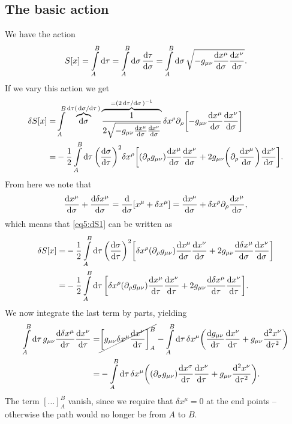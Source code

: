 \documentclass[11pt,a4paper, 
swedish, english %
]{article}
\begin{document}
\subsection{The basic action}
We have the action
\begin{equation}\label{eq5:S}
S[x]=\int_A^B\rd\tau=\int_A^B\rd\sigma\,\dv{\tau}{\sigma}
=\int_A^B\rd\sigma\,
\sqrt{-g_{\mu\nu}\dv{x^\mu}{\sigma}\dv{x^\nu}{\sigma}}.
\end{equation}
If we vary this action we get
\vspace{-1em}
\begin{equation}\label{eq5:dS1}
\begin{aligned}
\delta{S}[x]=&\int_A^B\overbrace{\rd\sigma}^{\rd\tau(\dv*{\sigma}{\tau})}
\overbrace{\frac{1}{2\sqrt{-g_{\mu\nu}\dv{x^\mu}{\sigma}\dv{x^\nu}{\sigma}}}}
^{=(2\dv*{\tau}{\sigma})^{-1}}
\delta{x}^\rho\pd_\rho\qty[-g_{\mu\nu}\dv{x^\mu}{\sigma}\dv{x^\nu}{\sigma}
]\\
=&-\frac{1}{2}\int_A^B\rd\tau\,
\qty(\dv{\sigma}{\tau})^2 \delta{x}^\rho
\qty[(\pd_{\rho}g_{\mu\nu})\dv{x^\mu}{\sigma}\dv{x^\nu}{\sigma}
+2g_{\mu\nu}\qty(\pd_{\rho}\dv{x^\mu}{\sigma})\dv{x^\nu}{\sigma}
].
\end{aligned}
\end{equation}
From here we note that
\begin{equation}
\dv{x^\mu}{\sigma}+\dv{\delta{x}^\mu}{\sigma}
=\dv{\sigma}\qty[x^\mu+\delta{x}^\mu]
=\dv{x^\mu}{\sigma}+\delta{x}^\rho\partial_\rho\dv{x^\mu}{\sigma},
\end{equation}
which means that \eqref{eq5:dS1} can be written as
\begin{equation}\label{eq5:dS2}
\begin{aligned}
\delta{S}[x]=&-\frac{1}{2}\int_A^B\rd\tau\,\qty(\dv{\sigma}{\tau})^2 
\qty[ \delta{x}^\rho(\pd_{\rho}g_{\mu\nu})
\dv{x^\mu}{\sigma}\dv{x^\nu}{\sigma}
+2g_{\mu\nu}\dv{\delta{x}^\mu}{\sigma}\dv{x^\nu}{\sigma}
]\\
=&-\frac{1}{2}\int_A^B\rd\tau\,
\qty[ \delta{x}^\rho(\pd_{\rho}g_{\mu\nu})
\dv{x^\mu}{\tau}\dv{x^\nu}{\tau}
+2g_{\mu\nu}\dv{\delta{x}^\mu}{\tau}\dv{x^\nu}{\tau}
].
\end{aligned}
\end{equation}
We now integrate the last term by parts, yielding
\begin{equation}
\begin{aligned}
\int_A^B\rd\tau\,g_{\mu\nu}\dv{\delta{x}^\mu}{\tau}\dv{x^\nu}{\tau}
=&\cancel{\qty[g_{\mu\nu}\delta{x}^\mu\dv{x^\nu}{\tau}]_A^B}
-\int_A^B\rd\tau\,\delta{x}^\mu
\qty(\dv{g_{\mu\nu}}{\tau}\dv{x^\nu}{\tau}
+g_{\mu\nu}\dv[2]{x^\nu}{\tau})\\
=&-\int_A^B\rd\tau\,\delta{x}^\mu
\qty((\pd_\sigma g_{\mu\nu})\dv{x^\sigma}{\tau}\dv{x^\nu}{\tau}
+g_{\mu\nu}\dv[2]{x^\nu}{\tau}).
\end{aligned}
\end{equation}
The term $[\ldots]_A^B$ vanish, since we require that
$\delta{x}^\mu=0$ at the end points -- otherwise the path would no
longer be from $A$ to $B$.
\end{document}
